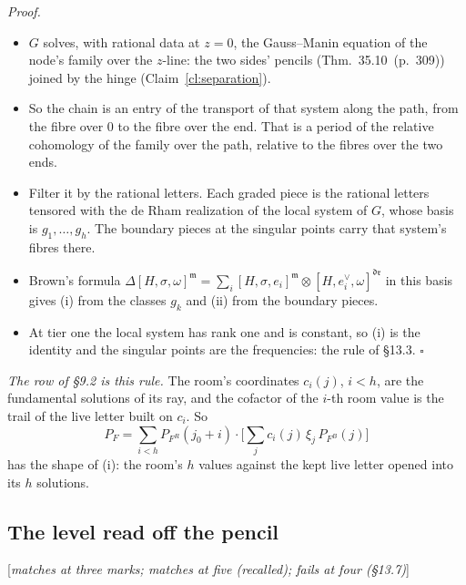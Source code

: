\documentclass[11pt]{article}
\newcommand{\status}[1]{\hfill{\small[\textit{#1}]}}
\newcommand{\hb}[2]{#1~(p.~#2)}   %
\theoremstyle{plain}
\theoremstyle{remark}
\begin{document}
\emph{Proof.}
\begin{itemize}
\item $G$ solves, with rational data at $z=0$, the Gauss--Manin equation of the node's family over the $z$-line: the two sides' pencils (Thm.~\hb{35.10}{309}) joined by the hinge (Claim~\ref{cl:separation}).
\item So the chain is an entry of the transport of that system along the path, from the fibre over $0$ to the fibre over the end. That is a period of the relative cohomology of the family over the path, relative to the fibres over the two ends.
\item Filter it by the rational letters. Each graded piece is the rational letters tensored with the de Rham realization of the local system of $G$, whose basis is $g_1,\dots,g_h$. The boundary pieces at the singular points carry that system's fibres there.
\item Brown's formula $\Delta[H,\sigma,\omega]^{\mathfrak m}=\sum_i[H,\sigma,e_i]^{\mathfrak m}\otimes[H,e_i^\vee,\omega]^{\mathfrak{dr}}$ in this basis gives (i) from the classes $g_k$ and (ii) from the boundary pieces.
\item At tier one the local system has rank one and is constant, so (i) is the identity and the singular points are the frequencies: the rule of \S13.3. $\square$
\end{itemize}

\emph{The row of \S9.2 is this rule.} The room's coordinates $c_i(j)$, $i<h$, are the fundamental solutions of its ray, and the cofactor of the $i$-th room value is the trail of the live letter built on $c_i$. So
\[
P_F=\sum_{i<h}P_{F^R}(j_0+i)\cdot\Big[\sum_j c_i(j)\,\xi_j\,P_{F^B}(j)\Big]
\]
has the shape of (i): the room's $h$ values against the kept live letter opened into its $h$ solutions.

\subsection{The level read off the pencil}\status{matches at three marks; matches at five (recalled); fails at four (\S13.7)}
\end{document}
